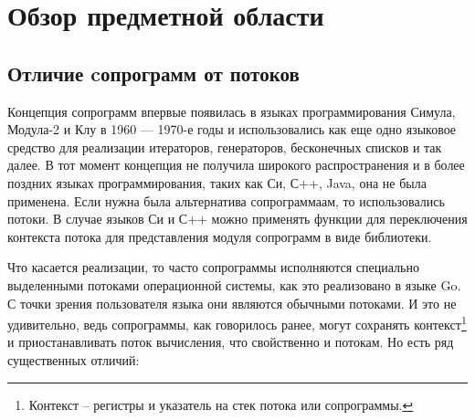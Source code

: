 \section{Обзор предметной области}
	\subsection{Отличие cопрограмм от потоков}
	Концепция сопрограмм впервые появилась в языках программирования Симула\cite{simula},
	Модула-2\cite{modula} и Клу\cite{clu} в 1960 — 1970-е годы и использовались как еще одно языковое средство для
	реализации итераторов, генераторов, бесконечных списков и так далее. В
	тот момент концепция не получила широкого распространения и в более поздних языках
	программирования, таких как Си, С++, Java, она не была применена. Если нужна была
	альтернатива сопрограммаам, то использовались потоки. В случае языков Си и С++ можно применять функции для
	переключения контекста потока для представления модуля сопрограмм в виде библиотеки.
	\par
	Что касается реализации, то часто сопрограммы исполняются специально выделенными потоками операционной системы,
	как это реализовано в языке Go. С точки зрения пользователя языка они являются обычными потоками.
	И это не удивительно, ведь сопрограммы, как говорилось ранее, могут сохранять контекст\footnote{Контекст -- регистры и указатель на стек потока или сопрограммы.} и приостанавливать поток вычисления, что свойственно и потокам. Но есть ряд существенных отличий:
